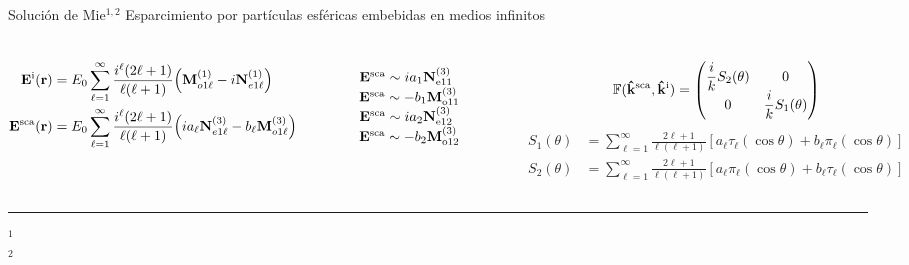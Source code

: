 
\begin{frame}{Solución de Mie$^{1,2}$}
	{Esparcimiento por partículas esféricas embebidas en medios infinitos}
	\scriptsize
	\renewcommand{\newcirc}{{\scaleobj{.625}{\circ}}}
\vspace*{-2em}
	\begin{columns}
	 \scriptsize
	\begin{align*}
	\vb{E}^\text{i} (\vb{r}) &= E_0 \sum_{\ell = 1}^\infty\frac{i^\ell(2\ell+1)}{\ell(\ell+1)}\qty( \vb{M}_{o1\ell}^{(1)} -i \vb{N}_{e1\ell}^{(1)})\\
	\vb{E}^\text{sca} (\vb{r}) &= E_0 \sum_{\ell = 1}^\infty\frac{i^\ell(2\ell+1)}{\ell(\ell+1)}\qty(i a_\ell \vb{N}_{e1\ell}^{(3)} -b_\ell \vb{M}_{o1\ell}^{(3)})
	\end{align*}

	\begin{figure}
	    \fontsize{4}{5}\selectfont \hfill %
    $\vb{E}^\text{sca} \sim  i a_1 \vb{N}^{(3)}_{\text{e}11}$\hfill
    $\vb{E}^\text{sca} \sim  - b_1 \vb{M}^{(3)}_{\text{o}11}$\hfill
    $\vb{E}^\text{sca} \sim  i a_2 \vb{N}^{(3)}_{\text{e}12}$\hfill
    $\vb{E}^\text{sca} \sim  - b_2 \vb{M}^{(3)}_{\text{o}12}$\hfill\\[-2em]
	\def\svgwidth{1\textwidth}
\end{figure}
\scriptsize
$$ \mathbb{F}(\vu{k}^\text{sca},\vu{k}^\text{i})
            = \mqty(\dfrac{i}{k}S_2(\theta) & 0 \\
			0 & \dfrac{i}{k}S_1(\theta)  )$$
			\vspace*{-2.em}
\begin{align*}
S_1(\theta)  &= \sum_{\ell = 1}^\infty \frac{2\ell+1}{\ell(\ell+1)}
						[a_\ell\tau_\ell(\cos\theta)+b_\ell\pi_\ell(\cos\theta)]
\\
S_2(\theta) &= \sum_{\ell = 1}^\infty \frac{2\ell+1}{\ell(\ell+1)}
						[a_\ell\pi_\ell(\cos\theta)+b_\ell\tau_\ell(\cos\theta)]
\end{align*}

	 	 \centering
\begin{figure}
	\def\svgwidth{1\textwidth} \fontsize{4}{5}\selectfont
  \\[1em]
  \def\svgwidth{.95\textwidth} 
\end{figure}
	\end{columns}
	\vspace*{.5em}
	\noindent\rule{.25\textwidth}{0.4pt}
 \begin{spacing}{0}\fontsize{4}{5} \selectfont
	$^1$ \\
	$^2$ 
	\end{spacing}
\end{frame}

